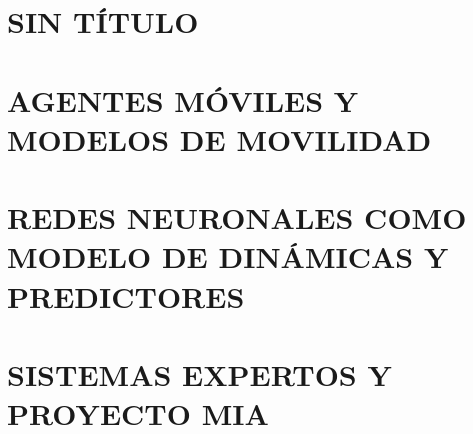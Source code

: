 \documentclass[krantz1,ChapterTOCs]{krantz}
\begin{document}
\part{SIN TÍTULO}


\part{AGENTES MÓVILES Y MODELOS DE MOVILIDAD}


\part{REDES NEURONALES COMO MODELO DE DINÁMICAS Y PREDICTORES}


\part{SISTEMAS EXPERTOS Y PROYECTO MIA}





\printindex
\end{document}
